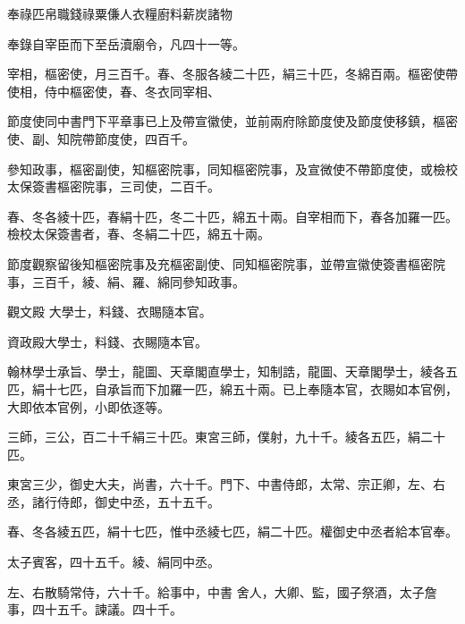
\begin{pinyinscope}

 奉祿匹帛職錢祿粟傔人衣糧廚料薪炭諸物



 奉錄自宰臣而下至岳瀆廟令，凡四十一等。



 宰相，樞密使，月三百千。春、冬服各綾二十匹，絹三十匹，冬綿百兩。樞密使帶
 使相，侍中樞密使，春、冬衣同宰相、



 節度使同中書門下平章事已上及帶宣徽使，並前兩府除節度使及節度使移鎮，樞密使、副、知院帶節度使，四百千。



 參知政事，樞密副使，知樞密院事，同知樞密院事，及宣微使不帶節度使，或檢校太保簽書樞密院事，三司使，二百千。



 春、冬各綾十匹，春絹十匹，冬二十匹，綿五十兩。自宰相而下，春各加羅一匹。檢校太保簽書者，春、冬絹二十匹，綿五十兩。



 節度觀察留後知樞密院事及充樞密副使、同知樞密院事，並帶宣徽使簽書樞密院事，三百千，綾、絹、羅、綿同參知政事。



 觀文殿
 大學士，料錢、衣賜隨本官。



 資政殿大學士，料錢、衣賜隨本官。



 翰林學士承旨、學士，龍圖、天章閣直學士，知制誥，龍圖、天章閣學士，綾各五匹，絹十七匹，自承旨而下加羅一匹，綿五十兩。已上奉隨本官，衣賜如本官例，大即依本官例，小即依逐等。



 三師，三公，百二十千絹三十匹。東宮三師，僕射，九十千。綾各五匹，絹二十匹。



 東宮三少，御史大夫，尚書，六十千。門下、中書侍郎，太常、宗正卿，左、右丞，諸行侍郎，御史中丞，五十五千。



 春、冬各綾五匹，絹十七匹，惟中丞綾七匹，絹二十匹。權御史中丞者給本官奉。



 太子賓客，四十五千。綾、絹同中丞。



 左、右散騎常侍，六十千。給事中，中書
 舍人，大卿、監，國子祭酒，太子詹事，四十五千。諫議。四十千。




\end{pinyinscope}
